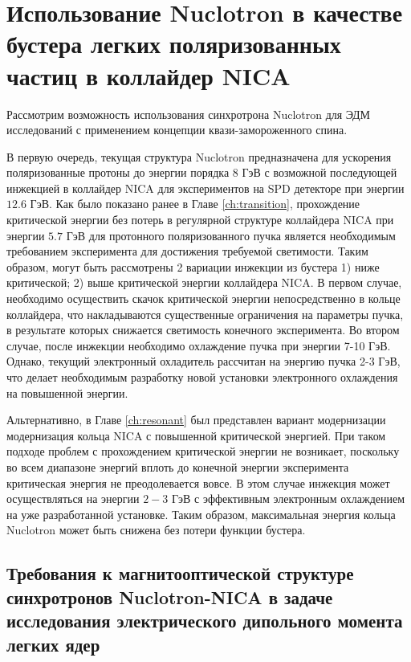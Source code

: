 	\section{Использование Nuclotron в качестве бустера легких поляризованных частиц в коллайдер NICA}\label{sec:EDM/nuclotron}

\par Рассмотрим возможность использования синхротрона Nuclotron для ЭДМ исследований с применением концепции квази-замороженного спина.
\par В первую очередь, текущая структура Nuclotron предназначена для ускорения поляризованные протоны до энергии порядка $8$ ГэВ с возможной последующей инжекцией в коллайдер NICA для экспериментов на SPD детекторе при энергии $12.6$ ГэВ. Как было показано ранее в Главе \ref{ch:transition}, прохождение критической энергии без потерь в регулярной структуре коллайдера NICA при энергии $5.7$ ГэВ для протонного поляризованного пучка является необходимым требованием эксперимента для достижения требуемой светимости. Таким образом, могут быть рассмотрены 2 вариации инжекции из бустера 1) ниже критической; 2) выше критической энергии коллайдера NICA. В первом случае, необходимо осуществить скачок критической энергии непосредственно в кольце коллайдера, что накладываются существенные ограничения на параметры пучка, в результате которых снижается светимость конечного эксперимента. Во втором случае, после инжекции необходимо охлаждение пучка при энергии 7-10 ГэВ. Однако, текущий электронный охладитель рассчитан на энергию пучка 2-3 ГэВ, что делает необходимым разработку новой установки электронного охлаждения на повышенной энергии.

\par Альтернативно, в Главе \ref{ch:resonant} был представлен вариант модернизации модернизация кольца NICA с повышенной критической энергией. При таком подходе проблем с прохождением критической энергии не возникает, поскольку во всем диапазоне энергий вплоть до конечной энергии эксперимента критическая энергия не преодолевается вовсе. В этом случае инжекция может осуществляться на энергии $2-3$ ГэВ с эффективным электронным охлаждением на уже разработанной установке. Таким образом, максимальная энергия кольца Nuclotron может быть снижена без потери функции бустера.

	\subsection{Требования к магнитооптической структуре синхротронов Nuclotron-NICA в задаче исследования электрического дипольного момента легких ядер}\label{sec:EDM/requirements}

